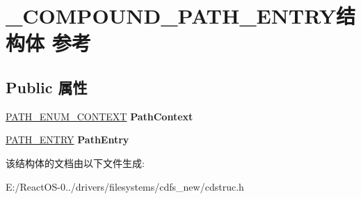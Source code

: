 \hypertarget{struct___c_o_m_p_o_u_n_d___p_a_t_h___e_n_t_r_y}{}\section{\+\_\+\+C\+O\+M\+P\+O\+U\+N\+D\+\_\+\+P\+A\+T\+H\+\_\+\+E\+N\+T\+R\+Y结构体 参考}
\label{struct___c_o_m_p_o_u_n_d___p_a_t_h___e_n_t_r_y}
\subsection*{Public 属性}
\begin{DoxyCompactItemize}
\item 
\mbox{\label{struct___c_o_m_p_o_u_n_d___p_a_t_h___e_n_t_r_y_a95f6d1823f47ae5b6ac93f86e7f6ab84}} 
\hyperlink{struct___p_a_t_h___e_n_u_m___c_o_n_t_e_x_t}{P\+A\+T\+H\+\_\+\+E\+N\+U\+M\+\_\+\+C\+O\+N\+T\+E\+XT} {\bfseries Path\+Context}
\item 
\mbox{\label{struct___c_o_m_p_o_u_n_d___p_a_t_h___e_n_t_r_y_a8bc7cc6184487db5ef47bd007ad58f88}} 
\hyperlink{struct___p_a_t_h___e_n_t_r_y}{P\+A\+T\+H\+\_\+\+E\+N\+T\+RY} {\bfseries Path\+Entry}
\end{DoxyCompactItemize}


该结构体的文档由以下文件生成\+:\begin{DoxyCompactItemize}
\item 
E\+:/\+React\+O\+S-\/0../drivers/filesystems/cdfs\+\_\+new/cdstruc.\+h\end{DoxyCompactItemize}
